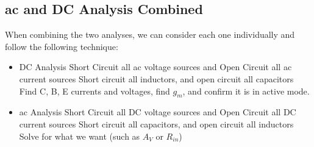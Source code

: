 \documentclass[12pt,letterpaper]{article} \usepackage{amsmath} \usepackage{graphicx} \usepackage[margin=1in]{geometry} \usepackage{longtable}  \usepackage{amssymb}
\begin{document}
	\subsection{ac and DC Analysis Combined}
	When combining the two analyses, we can consider each one individually and follow the following technique:
	\begin{itemize}
		\item DC Analysis
		\subitem Short Circuit all ac voltage sources and Open Circuit all ac current sources
		\subitem Short circuit all inductors, and open circuit all capacitors
		\subitem Find C, B, E currents and voltages, find $g_m$, and confirm it is in active mode.
		\item ac Analysis
		\subitem Short Circuit all DC voltage sources and Open Circuit all DC current sources
		\subitem Short circuit all capacitors, and open circuit all inductors
		\subitem Solve for what we want (such as $A_V$ or $R_{in}$)
	\end{itemize}
\end{document}
